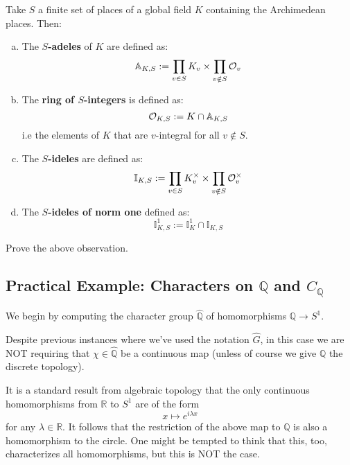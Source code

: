 \documentclass[11pt, x11names]{book}
\newcommand{\qq}{\mathbb{Q}}
\newcommand{\rr}{\mathbb{R}}
\renewcommand{\aa}{\mathbb{A}}
\newcommand{\ii}{\mathbb{I}}
\renewcommand{\hat}{\widehat}
\begin{document}
\begin{defn}
Take $S$ a finite set of places of a global field $K$ containing the Archimedean places. Then:
\begin{enumerate}[(a)]
    \item The \textbf{$S$-adeles} of $K$ are defined as:
    \begin{equation*}
        \aa_{K, S} := \prod_{v \in S} K_v \times \prod_{v \notin S} \calo_v
    \end{equation*}
    \item The \textbf{ring of $S$-integers} is defined as:
    \begin{equation*}
        \calo_{K, S} := K \cap \aa_{K, S}
    \end{equation*}
    i.e the elements of $K$ that are $v$-integral for all $v \notin S$.
    \item The \textbf{$S$-ideles} are defined as:
    \begin{equation*}
        \ii_{K, S} := \prod_{v \in S}K_v^\times \times \prod_{v \notin S}\calo_v^\times 
    \end{equation*}
    \item The \textbf{$S$-ideles of norm one} defined as:
    \begin{equation*}
        \ii_{K, S}^1 := \ii_K^1 \cap \ii_{K, S}
    \end{equation*}
\end{enumerate}
\end{defn}

\begin{observation}

\end{observation}

\begin{exercise}
    Prove the above observation.
\end{exercise}

\subsection{Practical Example: Characters on $\qq$ and $C_\qq$}
\label{subsection: character group of Q}
We begin by computing the character group $\hat{\qq}$ of homomorphisms $\qq \to S^1$.
\begin{warning}
    Despite previous instances where we've used the notation $\hat{G}$, in this case we are NOT requiring that $\chi \in \hat{\qq}$ be a continuous map (unless of course we give $\qq$ the discrete topology).
\end{warning}
It is a standard result from algebraic topology that the only continuous homomorphisms from $\rr$ to $S^1$ are of the form
\begin{equation*}
    x \mapsto e^{i \lambda x}
\end{equation*}
for any $\lambda \in \rr$. It follows that the restriction of the above map to $\qq$ is also a homomorphism to the circle. One might be tempted to think that this, too, characterizes all homomorphisms, but this is NOT the case.\\
\end{document}
